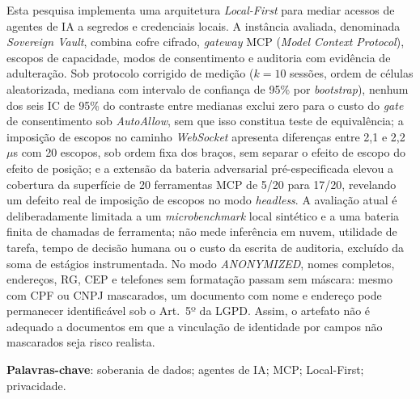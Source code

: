 \documentclass[12pt,openright,twoside,a4paper,english,brazil]{abntex2}
\begin{document}
\begin{resumo}
Esta pesquisa implementa uma arquitetura \textit{Local-First} para mediar acessos de agentes de IA a segredos e credenciais locais. A instância avaliada, denominada \textit{Sovereign Vault}, combina cofre cifrado, \textit{gateway} MCP (\textit{Model Context Protocol}), escopos de capacidade, modos de consentimento e auditoria com evidência de adulteração. Sob protocolo corrigido de medição ($k=10$ sessões, ordem de células aleatorizada, mediana com intervalo de confiança de 95\% por \textit{bootstrap}), nenhum dos seis IC de 95\% do contraste entre medianas exclui zero para o custo do \textit{gate} de consentimento sob \textit{AutoAllow}, sem que isso constitua teste de equivalência; a imposição de escopos no caminho \textit{WebSocket} apresenta diferenças entre 2,1 e 2,2~$\mu$s com 20 escopos, sob ordem fixa dos braços, sem separar o efeito de escopo do efeito de posição; e a extensão da bateria adversarial pré-especificada elevou a cobertura da superfície de 20 ferramentas MCP de 5/20 para 17/20, revelando um defeito real de imposição de escopos no modo \textit{headless}. A avaliação atual é deliberadamente limitada a um \textit{microbenchmark} local sintético e a uma bateria finita de chamadas de ferramenta; não mede inferência em nuvem, utilidade de tarefa, tempo de decisão humana ou o custo da escrita de auditoria, excluído da soma de estágios instrumentada. No modo \textit{ANONYMIZED}, nomes completos, endereços, RG, CEP e telefones sem formatação passam sem máscara: mesmo com CPF ou CNPJ mascarados, um documento com nome e endereço pode permanecer identificável sob o Art.~5º da LGPD. Assim, o artefato não é adequado a documentos em que a vinculação de identidade por campos não mascarados seja risco realista.\par
\textbf{Palavras-chave}: soberania de dados; agentes de IA; MCP; Local-First; privacidade.
\end{resumo}
\end{document}

